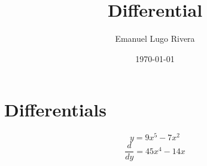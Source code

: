 \documentclass[a4paper,12pt]{article}
\title{Differential}
\author{Emanuel Lugo Rivera}
\date{\today}
\begin{document}
\begin{titlepage}
    \maketitle
\end{titlepage}


\section{Differentials}
$$\displaystyle y = 9x^5-7x^2$$
$$\displaystyle \frac{d}{dy}=45x^4-14x$$
\end{document}
